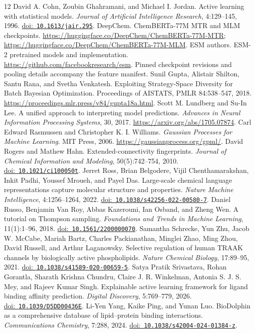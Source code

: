 \documentclass[wcp]{jmlr}
\providecommand{\doi}[1]{\href{https://doi.org/#1}{doi:~\nolinkurl{#1}}}
\begin{document}
\begin{thebibliography}{12}
David A. Cohn, Zoubin Ghahramani, and Michael I. Jordan.
Active learning with statistical models. \emph{Journal of Artificial
Intelligence Research}, 4:129--145, 1996.
\doi{10.1613/jair.295}.
DeepChem. ChemBERTa-77M MTR and MLM checkpoints.
\url{https://huggingface.co/DeepChem/ChemBERTa-77M-MTR};
\url{https://huggingface.co/DeepChem/ChemBERTa-77M-MLM}.
ESM authors. ESM-2 pretrained models and implementation.
\url{https://github.com/facebookresearch/esm}.
Pinned checkpoint revisions and pooling details accompany the feature manifest.
Sunil Gupta, Alistair Shilton, Santu Rana, and Svetha Venkatesh.
Exploiting Strategy-Space Diversity for Batch Bayesian Optimization.
Proceedings of AISTATS, PMLR 84:538--547, 2018.
\url{https://proceedings.mlr.press/v84/gupta18a.html}.
Scott M. Lundberg and Su-In Lee. A unified approach to interpreting model
predictions. \emph{Advances in Neural Information Processing Systems}, 30, 2017.
\url{https://arxiv.org/abs/1705.07874}.
Carl Edward Rasmussen and Christopher K. I. Williams.
\emph{Gaussian Processes for Machine Learning}. MIT Press, 2006.
\url{https://gaussianprocess.org/gpml/}.
David Rogers and Mathew Hahn. Extended-connectivity fingerprints.
\emph{Journal of Chemical Information and Modeling}, 50(5):742--754, 2010.
\doi{10.1021/ci100050t}.
Jerret Ross, Brian Belgodere, Vijil Chenthamarakshan, Inkit Padhi,
Youssef Mroueh, and Payel Das. Large-scale chemical language representations
capture molecular structure and properties. \emph{Nature Machine Intelligence},
4:1256--1264, 2022. \doi{10.1038/s42256-022-00580-7}.
Daniel Russo, Benjamin Van Roy, Abbas Kazerouni, Ian Osband, and Zheng Wen.
A tutorial on Thompson sampling. \emph{Foundations and Trends in Machine
Learning}, 11(1):1--96, 2018. \doi{10.1561/2200000070}.
Samantha Schrecke, Yun Zhu, Jacob W. McCabe, Mariah Bartz, Charles Packianathan,
Minglei Zhao, Ming Zhou, David Russell, and Arthur Laganowsky.
Selective regulation of human TRAAK channels by biologically active
phospholipids. \emph{Nature Chemical Biology}, 17:89--95, 2021.
\doi{10.1038/s41589-020-00659-5}.
Satya Pratik Srivastava, Rohan Gorantla, Sharath Krishna Chundru,
Claire J. R. Winkelman, Antonia S. J. S. Mey, and Rajeev Kumar Singh.
Explainable active learning framework for ligand binding affinity prediction.
\emph{Digital Discovery}, 5:769--779, 2026. \doi{10.1039/D5DD00436E}.
Li-Yen Yang, Kaike Ping, and Yunan Luo.
BioDolphin as a comprehensive database of lipid--protein binding interactions.
\emph{Communications Chemistry}, 7:288, 2024.
\doi{10.1038/s42004-024-01384-z}.
\end{thebibliography}
\end{document}
